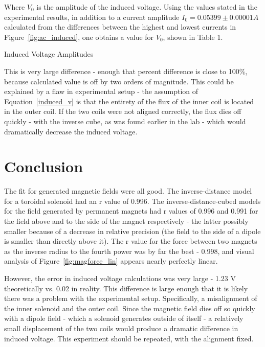 \documentclass[journal]{IEEEtran}
\begin{document}
Where $V_0$ is the amplitude of the induced voltage. Using the values stated in
the experimental results, in addition to a current amplitude $I_0 = 0.05399 \pm
0.00001 A$ calculated from the differences between the highest and lowest
currents in Figure~\ref{fig:ac_induced}, one obtains a value for $V_0$, shown
in Table 1.

\begin{table}[h]
\centering
\caption{\normalsize{Induced Voltage Amplitudes}}
\medskip
\caption{Table 1: Directly measured induced voltage amplitude, and the
Faraday's law calculation of voltage amplitude}
\end{table}

This is very large difference - enough that percent difference is close to
100\%, because calculated value is off by two orders of magnitude. This could
be explained by a flaw in experimental setup - the assumption of
Equation~\ref{induced_v} is that the entirety of the flux of the inner coil is
located in the outer coil. If the two coils were not aligned correctly, the
flux dies off quickly - with the inverse cube, as was found earlier in the lab
- which would dramatically decrease the induced voltage.

\section{Conclusion}

The fit for generated magnetic fields were all good. The inverse-distance model
for a toroidal solenoid had an r value of 0.996. The inverse-distance-cubed
    models for the field generated by permanent magnets had r values of 0.996
    and 0.991 for the field above and to the side of the magnet respectively -
    the latter possibly smaller because of a decrease in relative precision
    (the field to the side of a dipole is smaller than directly above it). The
    r value for the force between two magnets as the inverse radius to the
    fourth power was by far the best - 0.998, and visual analysis of
    Figure~\ref{fig:magforce_lin} appears nearly perfectly linear.

However, the error in induced voltage calculations was very large - 1.23 V
theoretically vs. 0.02 in reality. This difference is large enough that it is
likely there was a problem with the experimental setup. Specifically, a
misalignment of the inner solenoid and the outer coil. Since the magnetic field
dies off so quickly with a dipole field - which a solenoid generates outside of
itself - a relatively small displacement of the two coils would produce a
dramatic difference in induced voltage. This experiment should be repeated,
with the alignment fixed.
\end{document}
